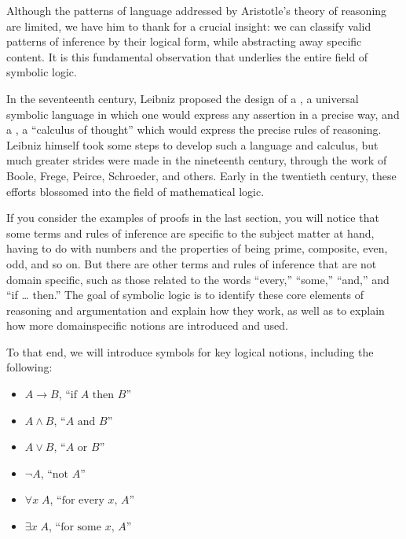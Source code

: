 \documentclass[letterpaper,10pt,english]{sphinxmanual}
\begin{document}
\sphinxAtStartPar
Although the patterns of language addressed by Aristotle’s theory of reasoning are limited, we have him to thank for a crucial insight: we can classify valid patterns of inference by their logical form, while abstracting away specific content. It is this fundamental observation that underlies the entire field of symbolic logic.

\sphinxAtStartPar
In the seventeenth century, Leibniz proposed the design of a , a universal symbolic language in which one would express any assertion in a precise way, and a , a “calculus of thought” which would express the precise rules of reasoning. Leibniz himself took some steps to develop such a language and calculus, but much greater strides were made in the nineteenth century, through the work of Boole, Frege, Peirce, Schroeder, and others. Early in the twentieth century, these efforts blossomed into the field of mathematical logic.

\sphinxAtStartPar
If you consider the examples of proofs in the last section, you will notice that some terms and rules of inference are specific to the subject matter at hand, having to do with numbers and the properties of being prime, composite, even, odd, and so on. But there are other terms and rules of inference that are not domain specific, such as those related to the words “every,” “some,” “and,” and “if … then.” The goal of symbolic logic is to identify these core elements of reasoning and argumentation and explain how they work, as well as to explain how more domain\sphinxhyphen{}specific notions are introduced and used.

\sphinxAtStartPar
To that end, we will introduce symbols for key logical notions, including the following:
\begin{itemize}
\item {} 
\sphinxAtStartPar
\(A \to B\), “\(\mbox{if $A$ then $B$}\)”

\item {} 
\sphinxAtStartPar
\(A \wedge B\), “\(\mbox{$A$ and $B$}\)”

\item {} 
\sphinxAtStartPar
\(A \vee B\), “\(\mbox{$A$ or $B$}\)”

\item {} 
\sphinxAtStartPar
\(\neg A\), “\(\mbox{not $A$}\)”

\item {} 
\sphinxAtStartPar
\(\forall x \; A\), “\(\mbox{for every $x$, $A$}\)”

\item {} 
\sphinxAtStartPar
\(\exists x \; A\), “\(\mbox{for some $x$, $A$}\)”

\end{itemize}
\end{document}
